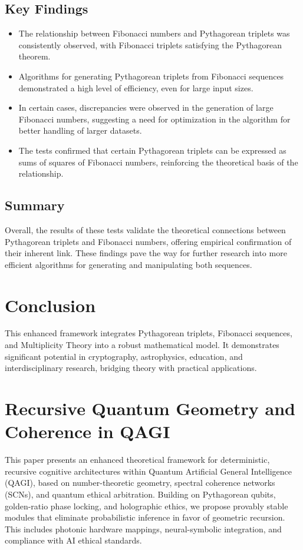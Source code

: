 \documentclass[11pt]{article}
\begin{document}
\subsection{Key Findings}
\begin{itemize}
    \item The relationship between Fibonacci numbers and Pythagorean triplets was consistently observed, with Fibonacci triplets satisfying the Pythagorean theorem.
    \item Algorithms for generating Pythagorean triplets from Fibonacci sequences demonstrated a high level of efficiency, even for large input sizes.
    \item In certain cases, discrepancies were observed in the generation of large Fibonacci numbers, suggesting a need for optimization in the algorithm for better handling of larger datasets.
    \item The tests confirmed that certain Pythagorean triplets can be expressed as sums of squares of Fibonacci numbers, reinforcing the theoretical basis of the relationship.
\end{itemize}

\subsection{Summary}
Overall, the results of these tests validate the theoretical connections between Pythagorean triplets and Fibonacci numbers, offering empirical confirmation of their inherent link. These findings pave the way for further research into more efficient algorithms for generating and manipulating both sequences.

\section{Conclusion}
This enhanced framework integrates Pythagorean triplets, Fibonacci sequences, and Multiplicity Theory into a robust mathematical model. It demonstrates significant potential in cryptography, astrophysics, education, and interdisciplinary research, bridging theory with practical applications.

\section{Recursive Quantum Geometry and Coherence in QAGI}

This paper presents an enhanced theoretical framework for deterministic, recursive cognitive architectures within Quantum Artificial General Intelligence (QAGI), based on number-theoretic geometry, spectral coherence networks (SCNs), and quantum ethical arbitration. Building on Pythagorean qubits, golden-ratio phase locking, and holographic ethics, we propose provably stable modules that eliminate probabilistic inference in favor of geometric recursion. This includes photonic hardware mappings, neural-symbolic integration, and compliance with AI ethical standards.
\end{document}
